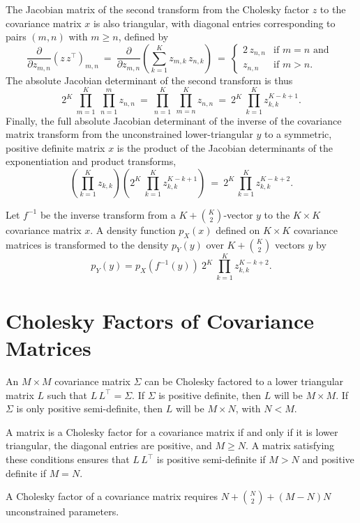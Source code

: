 The Jacobian matrix of the second transform from the Cholesky factor $z$ to
the covariance matrix $x$ is also triangular, with diagonal entries
corresponding to pairs $(m,n)$ with $m \geq n$, defined by
\[
\frac{\partial}{\partial z_{m,n}}
\left( z \, z^{\top} \right)_{m,n}
\ = \
\frac{\partial}{\partial z_{m,n}}
\left( \sum_{k=1}^K z_{m,k} \, z_{n,k} \right)
\ = \
\left\{
\begin{array}{cl}
2 \, z_{n,n} & \mbox{if } m = n \mbox{ and }
\\[4pt]
z_{n,n} & \mbox{if } m > n.
\end{array}
\right.
\]
%
The absolute Jacobian determinant of the second transform is thus
\[
2^{K} \ \prod_{m = 1}^{K} \ \prod_{n=1}^{m} z_{n,n}
\ = \
\prod_{n=1}^K \ \prod_{m=n}^K z_{n,n}
\ = \ 
2^{K} \ \prod_{k=1}^K z_{k,k}^{K - k + 1}.
\]
Finally, the full absolute Jacobian determinant of the inverse
of the covariance matrix transform from the unconstrained lower-triangular 
$y$ to a symmetric, positive definite matrix $x$ is the product of the
Jacobian determinants of the exponentiation and product transforms,
\[
\left( \prod_{k=1}^K z_{k,k} \right)
\left( 
2^{K} \ \prod_{k=1}^K z_{k,k}^{K - k + 1}
\right) 
\ = \
2^K
\, \prod_{k=1}^K z_{k,k}^{K-k+2}.
\]

Let $f^{-1}$ be the inverse transform from a $K + \binom{K}{2}$-vector
$y$ to the $K \times K$ covariance matrix $x$.  A density function
$p_X(x)$ defined on $K \times K$ covariance matrices is transformed to
the density $p_Y(y)$ over $K + \binom{K}{2}$ vectors $y$ by
\[
p_Y(y) = p_X(f^{-1}(y)) \ 2^K \ \prod_{k=1}^K z_{k,k}^{K-k+2}.
\]

\section{Cholesky Factors of Covariance Matrices}

An $M \times M$ covariance matrix $\Sigma$ can be Cholesky factored to
a lower triangular matrix $L$ such that $L\,L^{\top} = \Sigma$.  If
$\Sigma$ is positive definite, then $L$ will be $M \times M$.  If
$\Sigma$ is only positive semi-definite, then $L$ will be $M \times N$,
with $N < M$.  

A matrix is a Cholesky factor for a covariance matrix if and only if
it is lower triangular, the diagonal entries are positive, and $M \geq
N$.  A matrix satisfying these conditions ensures that $L \,
L^{\top}$ is positive semi-definite if $M > N$ and positive definite
if $M = N$.

A Cholesky factor of a covariance matrix requires $N + \binom{N}{2} +
(M - N)N$ unconstrained parameters.

